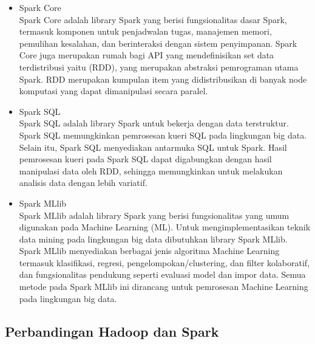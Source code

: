\begin{itemize}
\item Spark Core \\
Spark Core adalah library Spark yang berisi fungsionalitas dasar Spark, termasuk komponen untuk penjadwalan tugas, manajemen memori, pemulihan kesalahan, dan berinteraksi dengan sistem penyimpanan. Spark Core juga merupakan rumah bagi API yang mendefinisikan set data terdistribusi yaitu (RDD), yang merupakan abstraksi pemrograman utama Spark. RDD merupakan kumpulan item yang didistribusikan di banyak node komputasi yang dapat dimanipulasi secara paralel.
\item Spark SQL  \\
Spark SQL adalah library Spark untuk bekerja dengan data terstruktur. Spark SQL memungkinkan pemrosesan kueri SQL pada lingkungan big data. Selain itu, Spark SQL menyediakan antarmuka SQL untuk Spark. Hasil pemrosesan kueri pada Spark SQL dapat digabungkan dengan hasil manipulasi data oleh RDD, sehingga memungkinkan untuk melakukan analisis data dengan lebih variatif.
\item
Spark MLlib \\
Spark MLlib adalah library Spark yang berisi fungsionalitas yang umum digunakan pada Machine Learning (ML). Untuk mengimplementasikan teknik data mining pada lingkungan big data dibutuhkan library Spark MLlib. Spark MLlib menyediakan berbagai jenis algoritma Machine Learning termasuk klasifikasi, regresi, pengelompokan/clustering, dan filter kolaboratif, dan fungsionalitas pendukung seperti evaluasi model dan impor data. Semua metode pada Spark MLlib ini dirancang untuk pemrosesan Machine Learning pada lingkungan big data.
\end{itemize}

\newpage
\subsection{Perbandingan Hadoop dan Spark}

